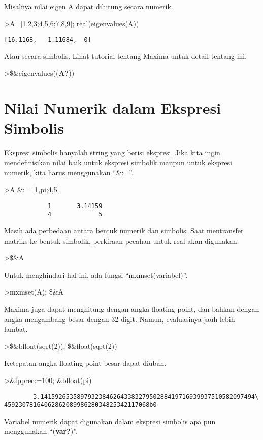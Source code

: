\documentclass[
]{book}
\begin{document}
Misalnya nilai eigen A dapat dihitung secara numerik.

\textgreater A={[}1,2,3;4,5,6;7,8,9{]}; real(eigenvalues(A))

\begin{verbatim}
[16.1168,  -1.11684,  0]
\end{verbatim}

Atau secara simbolis. Lihat tutorial tentang Maxima untuk detail tentang ini.

\textgreater\$\&eigenvalues((\textbf{A?}))

\chapter{Nilai Numerik dalam Ekspresi Simbolis}\label{nilai-numerik-dalam-ekspresi-simbolis}

Ekspresi simbolis hanyalah string yang berisi ekspresi. Jika kita ingin mendefinisikan nilai baik untuk ekspresi simbolik maupun untuk ekspresi numerik, kita harus menggunakan ``\&:=''.

\textgreater A \&:= {[}1,pi;4,5{]}

\begin{verbatim}
            1       3.14159 
            4             5 
\end{verbatim}

Masih ada perbedaan antara bentuk numerik dan simbolis. Saat mentransfer matriks ke bentuk simbolik, perkiraan pecahan untuk real akan digunakan.

\textgreater\$\&A

Untuk menghindari hal ini, ada fungsi ``mxmset(variabel)''.

\textgreater mxmset(A); \$\&A

Maxima juga dapat menghitung dengan angka floating point, dan bahkan dengan angka mengambang besar dengan 32 digit. Namun, evaluasinya jauh lebih lambat.

\textgreater\$\&bfloat(sqrt(2)), \$\&float(sqrt(2))

Ketepatan angka floating point besar dapat diubah.

\textgreater\&fpprec:=100; \&bfloat(pi)

\begin{verbatim}
        3.14159265358979323846264338327950288419716939937510582097494\
4592307816406286208998628034825342117068b0
\end{verbatim}

Variabel numerik dapat digunakan dalam ekspresi simbolis apa pun menggunakan ``(\textbf{var?})''.
\end{document}
